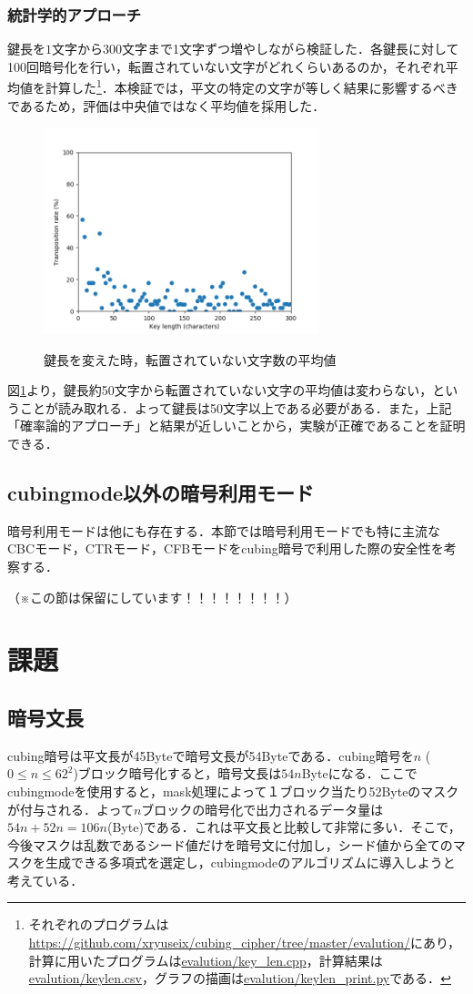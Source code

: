 \documentclass[a4j,titlepage]{jsarticle}
\begin{document}
\subsubsection{統計学的アプローチ}
鍵長を\(1\)文字から\(300\)文字まで1文字ずつ増やしながら検証した．各鍵長に対して100回暗号化を行い，転置されていない文字がどれくらいあるのか，それぞれ平均値を計算した\footnote{それぞれのプログラムは\url{https://github.com/xryuseix/cubing_cipher/tree/master/evalution/}にあり，計算に用いたプログラムは\url{evalution/key_len.cpp}，計算結果は\url{evalution/keylen.csv}，グラフの描画は\url{evalution/keylen_print.py}である．}．本検証では，平文の特定の文字が等しく結果に影響するべきであるため，評価は中央値ではなく平均値を採用した．
\begin{figure}
  \centering
  \includegraphics[width=8cm]{./tex_pic/figure.png}\\
  \caption{鍵長を変えた時，転置されていない文字数の平均値}
  \label{fig:key-len}
\end{figure}
図\ref{fig:key-len}より，鍵長約50文字から転置されていない文字の平均値は変わらない，ということが読み取れる．よって鍵長は50文字以上である必要がある．また，上記「確率論的アプローチ」と結果が近しいことから，実験が正確であることを証明できる．

\subsection{cubingmode以外の暗号利用モード}
暗号利用モードは他にも存在する．本節では暗号利用モードでも特に主流なCBCモード，CTRモード，CFBモードをcubing暗号で利用した際の安全性を考察する．

（※この節は保留にしています！！！！！！！！）

\section{課題}
\subsection{暗号文長}
cubing暗号は平文長が45Byteで暗号文長が54Byteである．cubing暗号を\(n\) (\(0 \leq n \leq 62^2\))ブロック暗号化すると，暗号文長は\(54n\)Byteになる．ここでcubingmodeを使用すると，mask処理によって１ブロック当たり52Byteのマスクが付与される．よって\(n\)ブロックの暗号化で出力されるデータ量は\(54n+52n=106n\)(Byte)である．これは平文長と比較して非常に多い．そこで，今後マスクは乱数であるシード値だけを暗号文に付加し，シード値から全てのマスクを生成できる多項式を選定し，cubingmodeのアルゴリズムに導入しようと考えている．
\end{document}
